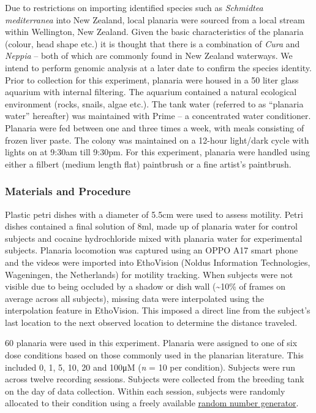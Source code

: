 \documentclass[
  jou,
  floatsintext,
  longtable,
  nolmodern,
  notxfonts,
  notimes,
  donotrepeattitle,
  colorlinks=true,linkcolor=blue,citecolor=blue,urlcolor=blue]{apa7}
\begin{document}
Due to restrictions on importing identified species such as
\emph{Schmidtea mediterranea} into New Zealand, local planaria were
sourced from a local stream within Wellington, New Zealand. Given the
basic characteristics of the planaria (colour, head shape etc.) it is
thought that there is a combination of \emph{Cura} and \emph{Neppia} --
both of which are commonly found in New Zealand waterways. We intend to
perform genomic analysis at a later date to confirm the species
identity. Prior to collection for this experiment, planaria were housed
in a 50 liter glass aquarium with internal filtering. The aquarium
contained a natural ecological environment (rocks, snails, algae etc.).
The tank water (referred to as ``planaria water'' hereafter) was
maintained with Prime -- a concentrated water conditioner. Planaria were
fed between one and three times a week, with meals consisting of frozen
liver paste. The colony was maintained on a 12-hour light/dark cycle
with lights on at 9:30am till 9:30pm. For this experiment, planaria were
handled using either a filbert (medium length flat) paintbrush or a fine
artist's paintbrush.

\subsubsection{Materials and Procedure}\label{materials-and-procedure}

Plastic petri dishes with a diameter of 5.5cm were used to assess
motility. Petri dishes contained a final solution of 8ml, made up of
planaria water for control subjects and cocaine hydrochloride mixed with
planaria water for experimental subjects. Planaria locomotion was
captured using an OPPO A17 smart phone and the videos were imported into
EthoVision (Noldus Information Technologies, Wageningen, the
Netherlands) for motility tracking. When subjects were not visible due
to being occluded by a shadow or dish wall (\textasciitilde10\% of
frames on average across all subjects), missing data were interpolated
using the interpolation feature in EthoVision. This imposed a direct
line from the subject's last location to the next observed location to
determine the distance traveled.

60 planaria were used in this experiment. Planaria were assigned to one
of six dose conditions based on those commonly used in the planarian
literature. This included 0, 1, 5, 10, 20 and 100μM (\emph{n} = 10 per
condition). Subjects were run across twelve recording
sessions.
Subjects were collected from the breeding tank on the day of data
collection. Within each session, subjects were randomly allocated to
their condition using a freely available
\href{https://stattrek.com/statistics/random-number-generator\#table}{random
number generator}.
\end{document}
